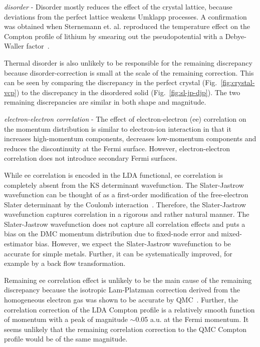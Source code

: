 \documentclass[aps,prb,showpacs,preprintnumbers,amsmath,amssymb,superscriptaddress,twocolumn]{revtex4-1}
\begin{document}
\emph{disorder} - Disorder mostly reduces the effect of the crystal lattice, because deviations from the perfect lattice weakens Umklapp processes. A confirmation was obtained when Sternemann et. al. reproduced the temperature effect on the Compton profile of lithium by smearing out the pseudopotential with a Debye-Waller factor~\cite{Sternemann2001}.

Thermal disorder is also unlikely to be responsible for the remaining discrepancy because disorder-correction is small at the scale of the remaining correction. This can be seen by comparing the discrepancy in the perfect crystal (Fig.~\ref{fig:crystal-vcp}) to the discrepancy in the disordered solid (Fig.~\ref{fig:sl-jp-djp}). The two remaining discrepancies are similar in both shape and magnitude.


\emph{electron-electron correlation} - The effect of electron-electron (ee) correlation on the momentum distribution is similar to electron-ion interaction in that it increases high-momentum components, decreases low-momentum components and reduces the discontinuity at the Fermi surface. However, electron-electron correlation does not introduce secondary Fermi surfaces.

While ee correlation is encoded in the LDA functional, ee correlation is completely absent from the KS determinant wavefunction. The Slater-Jastrow wavefunction can be thought of as a first-order modification of the free-electron Slater determinant by the Coulomb interaction~\cite{Holzmann2003}. Therefore, the Slater-Jastrow wavefunction captures correlation in a rigorous and rather natural manner. The Slater-Jastrow wavefunction does not capture all correlation effects and puts a bias on the DMC momentum distribution due to fixed-node error and mixed-estimator bias. However, we expect the Slater-Jastrow wavefunction to be accurate for simple metals. Further, it can be systematically improved, for example by a back flow transformation.

Remaining ee correlation effect is unlikely to be the main cause of the remaining discrepancy because the isotropic Lam-Platzman correction derived from the homogeneous electron gas was shown to be accurate by QMC~\cite{Filippi1999,Bross2005}. Further, the correlation correction of the LDA Compton profile is a relatively smooth function of momentum with a peak of magnitude $\sim$0.05 a.u. at the Fermi momentum. It seems unlikely that the remaining correlation correction to the QMC Compton profile would be of the same magnitude.
\end{document}
